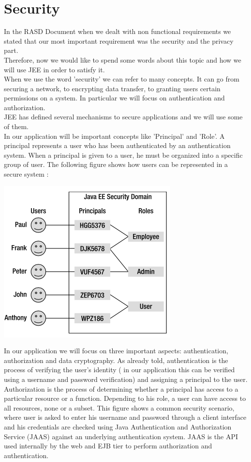 \documentclass[12pt]{book}
\begin{document}
\section{Security}
In the RASD Document when we dealt with non functional requirements we stated that our most important requirement was the security and the privacy part. \\
Therefore, now we would like to spend some words about this topic and how we will use JEE in order to satisfy it. \\
When we use the word 'security' we can refer to many concepts. It can go from securing a network, to encrypting data transfer, to granting users certain permissions on a system. In particular we will focus on authentication and authorization. \\
JEE has defined several mechanisms to secure applications and we will use some of them. \\
In our application will be important concepts like 'Principal' and 'Role'. A principal represents a user who has been authenticated by an authentication system. When a principal is given to a user, he must be organized into a specific group of user. The following figure shows how users can be represented in a secure system : 
\begin{center}
\includegraphics[scale=0.6]{principals}
\end{center}

In our application we will focus on three important aspects: authentication, authorization and data cryptography. 
As already told, authentication is the process of verifying the user's identity ( in our application this can be verified using a username and password verification) and assigning a principal to the user. \\Authorization is the process of determining whether a principal has access to a particular resource or a function. Depending to his role, a user can have access to all resources, none or a subset. 
This figure shows a common security scenario, where user is asked to enter his username and password through a client interface and his credentials are checked using Java Authentication and Authorization Service (JAAS) against an underlying authentication system. JAAS is the API used internally by the web and EJB tier to perform authorization and authentication. 
\end{document}
